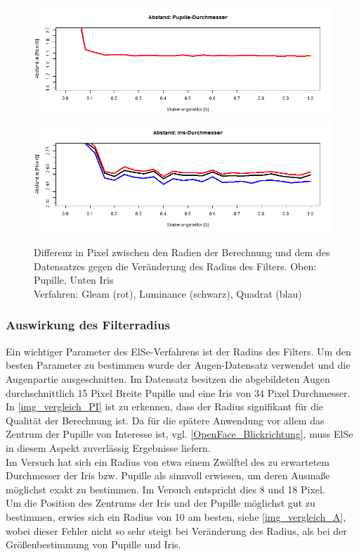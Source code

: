 \begin{figure}
	\centering
	\includegraphics[width=\linewidth]{Eye_Img_Box/Vergleich_Scal_P}
	\includegraphics[width=\linewidth]{Eye_Img_Box/Vergleich_Scal_I}
	\caption{Differenz in Pixel zwischen den Radien der Berechnung und dem des Datensatzes gegen die Veränderung des Radius des Filters. Oben: Pupille, Unten Iris\\
		Verfahren: Gleam (rot), Luminance (schwarz), Quadrat (blau)}
	\label{img_Vergleich_Scal_PI}
\end{figure}
\subsubsection{Auswirkung des Filterradius}
Ein wichtiger Parameter des ElSe-Verfahrens ist der Radius des Filters. Um den besten Parameter zu bestimmen wurde der Augen-Datensatz \cite{database_Eye} verwendet und die Augenpartie ausgeschnitten. Im Datensatz besitzen die abgebildeten Augen durchschnittlich 15 Pixel Breite Pupille und eine Iris von 34 Pixel Durchmesser.\\
In \autoref{img_vergleich_PI} ist zu erkennen, dass der Radius signifikant für die Qualität der Berechnung ist. Da für die spätere Anwendung vor allem das Zentrum der Pupille von Interesse ist, vgl. \autoref{OpenFace_Blickrichtung}, muss ElSe in diesem Aspekt zuverlässig Ergebnisse liefern.\\
Im Versuch hat sich ein Radius von etwa einem Zwölftel des zu erwartetem Durchmesser der Iris bzw. Pupille als sinnvoll erwiesen, um deren Ausmaße möglichst exakt zu bestimmen. Im Versuch entspricht dies 8 und 18 Pixel.\\
Um die Position des Zentrums der Iris und der Pupille möglichst gut zu bestimmen, erwies sich ein Radius von 10 am besten, siehe \autoref{img_vergleich_A}, wobei dieser Fehler nicht so sehr steigt bei Veränderung des Radius, als bei der Größenbestimmung von Pupille und Iris.
